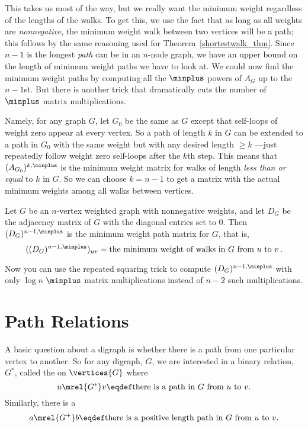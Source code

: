 \begin{editingnotes}
This takes us most of the way, but we really want the minimum weight
regardless of the lengths of the walks.  To get this, we use the fact that
as long as all weights are \emph{nonnegative}, the minimum weight walk
between two vertices will be a path; this follows by the same reasoning
used for Theorem~\ref{shortestwalk_thm}.  Since $n-1$ is the longest \emph{path}
can be in an $n$-node graph, we have an upper bound on the length of
minimum weight paths we have to look at.  We could now find the minimum
weight paths by computing all the $\minplus$ powers of $A_G$ up to the
$n-1$st.  But there is another trick that dramatically cuts the number of
$\minplus$ matrix multiplications.

Namely, for any graph $G$, let $G_0$ be the same as $G$ except that
self-loops of weight zero appear at every vertex.  So a path of length $k$
in $G$ can be extended to a path in $G_0$ with the same weight but with
any desired length $ \geq k$ ---just repeatedly follow weight zero
self-loops after the $k$th step.  This means that $(A_{G_0})^{k, \minplus}$
is the minimum weight matrix for walks of length \emph{less than or equal}
to $k$ in $G$.  So we can choose $k = n-1$ to get a matrix with the
actual minimum weights among all walks between vertices.

\begin{theorem}\label{thm:minweightmatrix}
Let $G$ be an $n$-vertex weighted graph with nonnegative weights, and let
$D_G$ be the adjacency matrix of $G$ with the diagonal entries set to 0.
Then $(D_G)^{n-1, \minplus}$ is the minimum weight path matrix for $G$, that
is,
\[
((D_G)^{n-1, \minplus})_{uv} = \text{the minimum weight of walks in $G$ from
 $u$ to $v$}\,.
\]
\end{theorem}
Now you can use the repeated squaring trick to compute $(D_G)^{n-1,
  \minplus}$ with only $\log n$ $\minplus$ matrix multiplications
instead of $n-2$ such multiplications.

\end{editingnotes}

\section{Path Relations}
A basic question about a digraph is whether there is a path from one
particular vertex to another.  So for any digraph, $G$, we are
interested in a binary relation, $G^*$, called the  on $\vertices{G}$ where
\begin{equation}\label{G*def}
u \mrel{G^*} v \eqdef \mbox{there is a path in $G$ from $u$ to $v$}.
\end{equation}
Similarly, there is a 
\begin{equation}\label{G+def}
a \mrel{G^+} b \eqdef \mbox{there is a positive length path in $G$ from $u$ to $v$}.
\end{equation}

